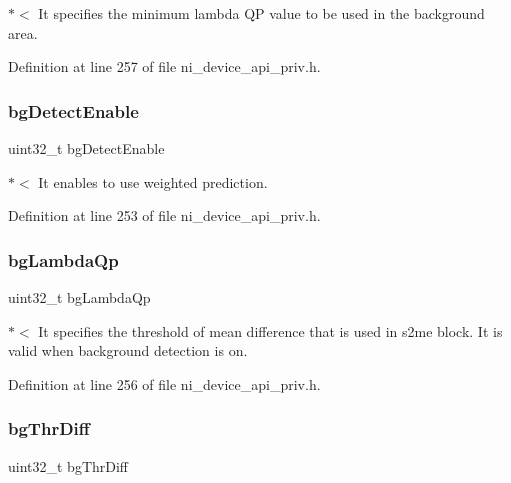 $\ast$$<$ It specifies the minimum lambda QP value to be used in the background area. 

Definition at line 257 of file ni\+\_\+device\+\_\+api\+\_\+priv.\+h.

\mbox{\label{struct__ni__t408__config__t_a0fc7213a1739d23598670c71e94ac82a}} 
\subsubsection{\texorpdfstring{bgDetectEnable}{bgDetectEnable}}
{\footnotesize\ttfamily uint32\+\_\+t bg\+Detect\+Enable}

$\ast$$<$ It enables to use weighted prediction. 

Definition at line 253 of file ni\+\_\+device\+\_\+api\+\_\+priv.\+h.

\mbox{\label{struct__ni__t408__config__t_ad7ac20e9c16bbc44823517ac1aeb8208}} 
\subsubsection{\texorpdfstring{bgLambdaQp}{bgLambdaQp}}
{\footnotesize\ttfamily uint32\+\_\+t bg\+Lambda\+Qp}

$\ast$$<$ It specifies the threshold of mean difference that is used in s2me block. It is valid when background detection is on. 

Definition at line 256 of file ni\+\_\+device\+\_\+api\+\_\+priv.\+h.

\mbox{\label{struct__ni__t408__config__t_a7af0e82843279faaad3e89c175665f60}} 
\subsubsection{\texorpdfstring{bgThrDiff}{bgThrDiff}}
{\footnotesize\ttfamily uint32\+\_\+t bg\+Thr\+Diff}

